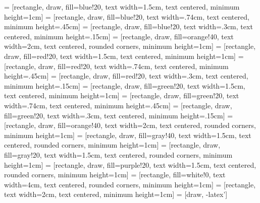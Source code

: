  = [rectangle, draw, fill=blue!20, 
    text width=1.5cm, text centered, minimum height=1cm]
 = [rectangle, draw, fill=blue!20, 
    text width=.74cm, text centered, minimum height=.45cm]
 = [rectangle, draw, fill=blue!20, 
    text width=.3cm, text centered, minimum height=.15cm]
%
 = [rectangle, draw, fill=orange!40,
    text width=2cm, text centered, rounded corners, minimum height=1cm]
%
 = [rectangle, draw, fill=red!20, 
    text width=1.5cm, text centered, minimum height=1cm]
 = [rectangle, draw, fill=red!20, 
    text width=.74cm, text centered, minimum height=.45cm]
 = [rectangle, draw, fill=red!20, 
    text width=.3cm, text centered, minimum height=.15cm]
%
 = [rectangle, draw, fill=green!20, 
    text width=1.5cm, text centered, minimum height=1cm]
 = [rectangle, draw, fill=green!20, 
    text width=.74cm, text centered, minimum height=.45cm]
 = [rectangle, draw, fill=green!20, 
    text width=.3cm, text centered, minimum height=.15cm]
%
 = [rectangle, draw, fill=orange!40,
    text width=2cm, text centered, rounded corners, minimum height=1cm]
 = [rectangle, draw, fill=gray!40, 
    text width=1.5cm, text centered, rounded corners, minimum height=1cm]
 = [rectangle, draw, fill=gray!20, 
    text width=1.5cm, text centered, rounded corners, minimum height=1cm]
 = [rectangle, draw, fill=purple!20, 
    text width=1.5cm, text centered, rounded corners, minimum height=1cm]
 = [rectangle, fill=white!0,
    text width=4cm, text centered, rounded corners, minimum height=1cm]
 = [rectangle, text width=2cm, 
	text centered, minimum height=1cm]
 = [draw, -latex']
\def\elwi{2cm}
\def\I{
\resizebox{\elwi}{!}{
\begin{tikzpicture}
	\node [image] (a) at (0,0) {Image};
\end{tikzpicture}
} }
\def\Id{
\resizebox{\elwi}{!}{
\begin{tikzpicture}
	\node [imaged] (ba) at (-4,.3) {};
	\node [imaged] (bb) at (-2.9,-.3) {};
	\node [imaged] (bc) at (-4,-.3) {};
	\node [imaged] (bd) at (-2.9,.3) {};
\end{tikzpicture}
} }
\def\Idd{
\resizebox{\elwi}{!}{
\begin{tikzpicture}
	\node [imagedd] (caa) at (2.3,.5) {};
	\node [imagedd] (cab) at (2.3,.2) {};
	\node [imagedd] (cac) at (1.7,.5) {};
	\node [imagedd] (cad) at (1.7,.2) {};
	\node [imagedd] (cba) at (3,.5) {};
	\node [imagedd] (cbd) at (3,.2) {};
	\node [imagedd] (cbc) at (3.6,.5) {};
	\node [imagedd] (cbd) at (3.6,.2) {};
	\node [imagedd] (cca) at (2.3,-.5) {};
	\node [imagedd] (ccb) at (2.3,-.2) {};
	\node [imagedd] (ccc) at (1.7,-.5) {};
	\node [imagedd] (ccd) at (1.7,-.2) {};
	\node [imagedd] (cda) at (3,-.5) {};
	\node [imagedd] (cdb) at (3,-.2) {};
	\node [imagedd] (cdc) at (3.6,-.5) {};
	\node [imagedd] (cdd) at (3.6,-.2) {};
\end{tikzpicture}
} }
